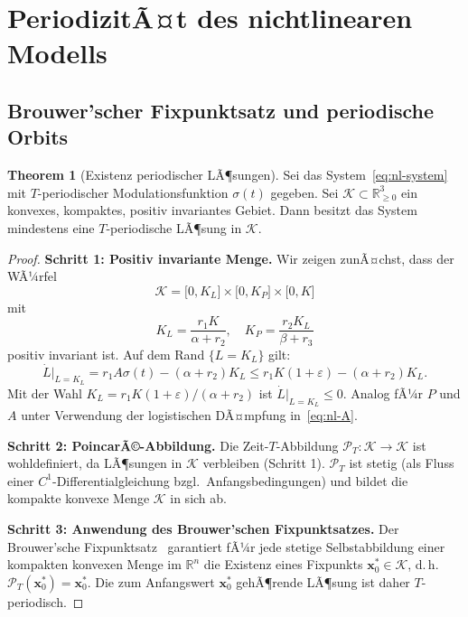 ﻿\documentclass[12pt, a4paper]{article}
\theoremstyle{definition}
\newtheorem{theorem}{Theorem}[section]
\newcommand{\R}{\mathbb{R}}
\begin{document}
\section{PeriodizitÃ¤t des nichtlinearen Modells}

\subsection{Brouwer'scher Fixpunktsatz und periodische Orbits}

\begin{theorem}[Existenz periodischer LÃ¶sungen]\label{thm:periodisch-nl}
Sei das System~\eqref{eq:nl-system} mit $T$-periodischer Modulationsfunktion
$\sigma(t)$ gegeben. Sei $\mathcal{K} \subset \R_{\geq 0}^3$ ein konvexes, kompaktes,
positiv invariantes Gebiet. Dann besitzt das System mindestens eine
$T$-periodische LÃ¶sung in $\mathcal{K}$.
\end{theorem}

\begin{proof}
\textbf{Schritt 1: Positiv invariante Menge.}
Wir zeigen zunÃ¤chst, dass der WÃ¼rfel
\[
  \mathcal{K} = \bigl[0, K_L\bigr] \times \bigl[0, K_P\bigr] \times \bigl[0, K\bigr]
\]
mit
\[
  K_L = \frac{r_1 K}{\alpha + r_2},\quad K_P = \frac{r_2 K_L}{\beta + r_3}
\]
positiv invariant ist. Auf dem Rand $\{L = K_L\}$ gilt:
\[
  \dot{L}\big|_{L=K_L} = r_1 A \sigma(t) - (\alpha + r_2) K_L
  \leq r_1 K (1 + \varepsilon) - (\alpha + r_2) K_L.
\]
Mit der Wahl $K_L = r_1 K (1+\varepsilon)/(\alpha + r_2)$ ist $\dot{L}|_{L=K_L} \leq 0$.
Analog fÃ¼r $P$ und $A$ unter Verwendung der logistischen DÃ¤mpfung in~\eqref{eq:nl-A}.

\textbf{Schritt 2: PoincarÃ©-Abbildung.}
Die Zeit-$T$-Abbildung $\mathcal{P}_T: \mathcal{K} \to \mathcal{K}$ ist
wohldefiniert, da LÃ¶sungen in $\mathcal{K}$ verbleiben (Schritt 1).
$\mathcal{P}_T$ ist stetig (als Fluss einer $C^1$-Differentialgleichung bzgl.\
Anfangsbedingungen) und bildet die kompakte konvexe Menge $\mathcal{K}$ in sich ab.

\textbf{Schritt 3: Anwendung des Brouwer'schen Fixpunktsatzes.}
Der Brouwer'sche Fixpunktsatz~\cite{Brouwer1911} garantiert fÃ¼r jede stetige
Selbstabbildung einer kompakten konvexen Menge im $\R^n$ die Existenz eines
Fixpunkts $\bm{x}^*_0 \in \mathcal{K}$, d.\,h.\
$\mathcal{P}_T(\bm{x}^*_0) = \bm{x}^*_0$. Die zum Anfangswert $\bm{x}^*_0$
gehÃ¶rende LÃ¶sung ist daher $T$-periodisch. \hfill
\end{proof}
\end{document}
